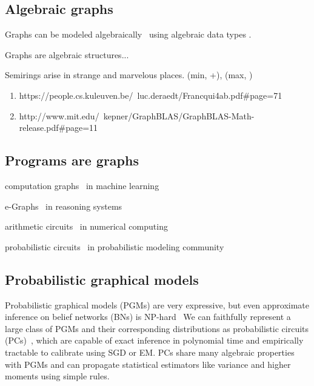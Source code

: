 \documentclass[11pt]{article}
\begin{document}
    \subsection{Algebraic graphs}\label{subsec:algebraic-graphs}

    Graphs can be modeled algebraically~\citep{weisfeiler1968reduction}  using algebraic data types \citep{mokhov2017algebraic}.

    Graphs are algebraic structures...

    Semirings arise in strange and marvelous places. (min, +), (max, \times)

    \begin{enumerate}
        \item https://people.cs.kuleuven.be/~luc.deraedt/Francqui4ab.pdf#page=71
        \item http://www.mit.edu/~kepner/GraphBLAS/GraphBLAS-Math-release.pdf#page=11
    \end{enumerate}

    \subsection{Programs are graphs}\label{sec:program-graphs}

    computation graphs~\citep{breuleux2017automatic} in machine learning

    e-Graphs~\citep{willsey2020egg} in reasoning systems

    arithmetic circuits~\citep{miller1988efficient} in numerical computing

    probabilistic circuits~\citep{choi2020probabilistic} in probabilistic modeling community

    \subsection{Probabilistic graphical models}\label{sec:pgms}

    Probabilistic graphical models (PGMs) are very expressive, but even approximate inference on belief networks (BNs) is NP-hard~\citep{dagum1993approximating} We can faithfully represent a large class of PGMs and their corresponding distributions as probabilistic circuits (PCs)~\citep{choi2020probabilistic}, which are capable of exact inference in polynomial time and empirically tractable to calibrate using SGD or EM. PCs share many algebraic properties with PGMs and can propagate statistical estimators like variance and higher moments using simple rules.
\end{document}
